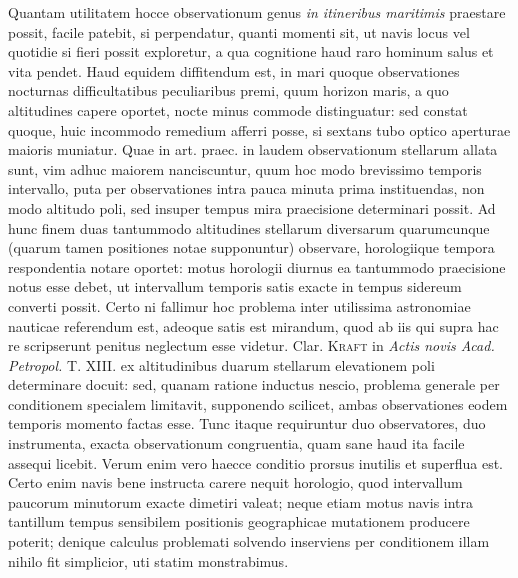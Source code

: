 Quantam utilitatem hocce observationum genus \textit{in itineribus maritimis} praestare possit, facile patebit, si perpendatur, quanti momenti sit, ut navis locus vel quotidie si fieri possit exploretur, a qua cognitione haud raro hominum salus et vita pendet. Haud equidem diffitendum est, in mari quoque observationes nocturnas difficultatibus peculiaribus premi, quum horizon maris, a quo altitudines capere oportet, nocte minus commode distinguatur: sed constat quoque, huic incommodo remedium afferri posse, si sextans tubo optico aperturae maioris muniatur.
Quae in art. praec. in laudem observationum stellarum allata sunt, vim adhuc maiorem nanciscuntur, quum hoc modo brevissimo temporis intervallo, puta per observationes intra pauca minuta prima instituendas, non modo altitudo poli, sed insuper tempus mira praecisione determinari possit. Ad hunc finem duas tantummodo altitudines stellarum diversarum quarumcunque (quarum tamen positiones notae supponuntur) observare, horologiique tempora respondentia notare oportet: motus horologii diurnus ea tantummodo praecisione notus esse debet, ut intervallum temporis satis exacte in tempus sidereum converti possit. Certo ni fallimur hoc problema inter utilissima astronomiae nauticae referendum est, adeoque satis est mirandum, quod ab iis qui supra hac re scripserunt penitus neglectum esse videtur. Clar. \textsc{Kraft} in \textit{Actis novis Acad. Petropol.} T. XIII. ex altitudinibus duarum stellarum elevationem poli determinare docuit: sed, quanam ratione inductus nescio, problema generale per conditionem specialem limitavit, supponendo scilicet, ambas observationes eodem temporis momento factas
esse. Tunc itaque requiruntur duo observatores, duo instrumenta, exacta observationum congruentia, quam sane haud ita facile assequi licebit. Verum enim vero haecce conditio prorsus inutilis et superflua est. Certo enim navis bene instructa carere nequit horologio, quod intervallum paucorum minutorum exacte dimetiri valeat; neque etiam motus navis intra tantillum tempus sensibilem positionis geographicae mutationem producere poterit; denique calculus problemati solvendo inserviens per conditionem illam nihilo fit simplicior, uti statim monstrabimus.
